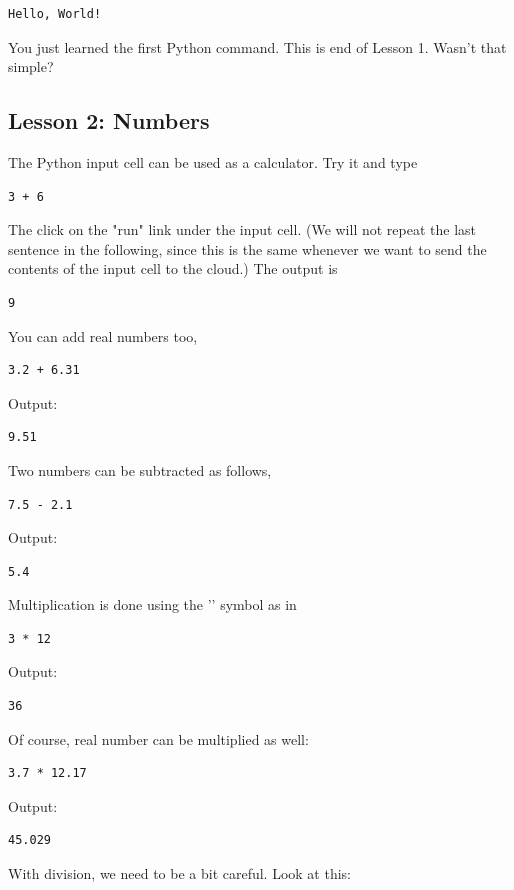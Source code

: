 \documentclass[article,A4,12pt]{llncs}
\begin{document}
\begin{verbatim}
Hello, World!
\end{verbatim}
You just learned the first Python command. This is end of Lesson 1. Wasn't that simple?

\subsection{Lesson 2: Numbers}

The Python input cell can be used as a calculator. Try it and type 

\begin{verbatim}
3 + 6
\end{verbatim}
The click on the "run" link under the input cell. (We will not repeat the last sentence 
in the following, since this is the same whenever we want to send the contents of the input 
cell to the cloud.) The output is

\begin{verbatim}
9
\end{verbatim}
You can add real numbers too,
\begin{verbatim}
3.2 + 6.31
\end{verbatim}
Output:

\begin{verbatim}
9.51
\end{verbatim}
Two numbers can be subtracted as follows,

\begin{verbatim}
7.5 - 2.1
\end{verbatim}
Output:

\begin{verbatim}
5.4
\end{verbatim}
Multiplication is done using the '{\tt *}' symbol as in

\begin{verbatim}
3 * 12
\end{verbatim}
Output:

\begin{verbatim}
36
\end{verbatim}
Of course, real number can be multiplied as well:

\begin{verbatim}
3.7 * 12.17
\end{verbatim}
Output:

\begin{verbatim}
45.029
\end{verbatim}
With division, we need to be a bit careful. Look at this:
\end{document}

